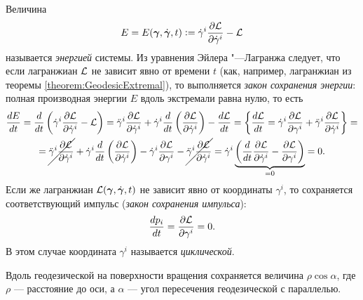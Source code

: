 \noindent
Величина
\[
	E = E(\boldsymbol{\gamma}, \dot{\boldsymbol{\gamma}}, t) \vcentcolon = \dot{\gamma}^i\frac{\partial\mathcal{L}}{\partial\dot{\gamma}^i} - \mathcal{L}
\]
называется \textit{энергией} системы. Из уравнения Эйлера "---Лагранжа следует, что если лагранжиан $\mathcal{L}$ не зависит явно от времени $t$ (как, например, лагранжиан из теоремы \ref{theorem:GeodesicExtremal}), то выполняется \textit{закон сохранения энергии}: полная производная энергии $E$ вдоль экстремали равна нулю, то есть
\begin{multline*}
	\frac{dE}{dt} = \frac{d}{dt}\left(\dot{\gamma}^i\frac{\partial\mathcal{L}}{\partial\dot{\gamma}^i} - \mathcal{L}\right) = \ddot{\gamma}^i\frac{\partial\mathcal{L}}{\partial\dot{\gamma}^i} + \dot{\gamma}^i\frac{d}{dt}\left(\frac{\partial\mathcal{L}}{\partial\dot{\gamma}^i}\right) - \frac{d\mathcal{L}}{dt} = \left\{\frac{d\mathcal{L}}{dt} = \dot{\gamma}^i\frac{\partial\mathcal{L}}{\partial\gamma^i} + \ddot{\gamma}^i\frac{\partial\mathcal{L}}{\partial\dot{\gamma}^i}\right\} =\\ = \cancel{\ddot{\gamma}^i\frac{\partial\mathcal{L}}{\partial\dot{\gamma}^i}} + \dot{\gamma}^i\frac{d}{dt}\left(\frac{\partial\mathcal{L}}{\partial\dot{\gamma}^i}\right) - \dot{\gamma}^i\frac{\partial\mathcal{L}}{\partial\gamma^i} - \cancel{\ddot{\gamma}^i\frac{\partial\mathcal{L}}{\partial\dot{\gamma}^i}} = \dot{\gamma}^i\underbrace{\left(\frac{d}{dt}\frac{\partial\mathcal{L}}{\partial\dot{\gamma}^i} - \frac{\partial\mathcal{L}}{\partial\gamma^i}\right)}_{{} = 0} = 0.
\end{multline*}
Если же лагранжиан $\mathcal{L}(\boldsymbol{\gamma}, \dot{\boldsymbol{\gamma}}, t)$ не зависит явно от координаты $\gamma^i$, то сохраняется соответствующий импульс (\textit{закон сохранения импульса}):
\[
	\frac{dp_i}{dt} = \frac{\partial\mathcal{L}}{\partial\gamma^i} = 0.
\]
В этом случае координата $\gamma^i$ называется \textit{циклической}.

\begin{theorem}[Клеро] \label{theorem:Clairaut}
	Вдоль геодезической на поверхности вращения сохраняется величина $\rho\cos\alpha$, где $\rho$ --- расстояние до оси, а $\alpha$ --- угол пересечения геодезической с параллелью.
\end{theorem}

